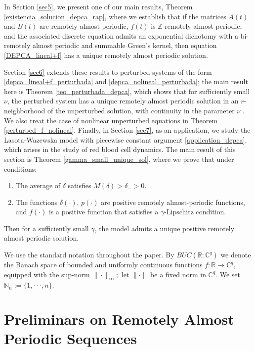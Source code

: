 \documentclass[english,,reqno]{amsart}
\numberwithin{equation}{section}
\theoremstyle{plain}
\theoremstyle{definition}
\theoremstyle{remark}
\begin{document}
In Section \ref{sec5}, we present one of our main results, Theorem \ref{existencia_solucion_depca_rap}, where we establish that if the matrices $A(t)$ and $B(t)$ are remotely almost periodic, $f(t)$ is $\mathbb{Z}$-remotely almost periodic, and the associated discrete equation admits an exponential dichotomy with a bi-remotely almost periodic and summable Green's kernel, then equation \eqref{DEPCA_lineal+f} has a unique remotely almost periodic solution. 

Section \ref{sec6} extends these results to perturbed systems of the form \eqref{depca_lineal+f_perturbada} and \eqref{depca_nolineal_perturbada}; the main result here is Theorem \ref{teo_perturbada_depca}, which shows that for sufficiently small $\nu$, the perturbed system has a unique remotely almost periodic solution in an $r$-neighborhood of the unperturbed solution, with continuity in the parameter $\nu$
. We also treat the case of nonlinear unperturbed equations in Theorem \ref{perturbed_f_nolineal}. Finally, in Section \ref{sec7}, as an application, we study the Lasota-Wazewska model with piecewise constant argument \eqref{application_depca}, which arises in the study of red blood cell dynamics. The main result of this section is Theorem \ref{gamma_small_unique_sol}, where we prove that under conditions:

\begin{enumerate}[label=\textbf{(LW.\arabic*)}]
\item\label{ILW1} The average of $\delta$ satisfies $M(\delta) > \delta_{-} > 0$.
\item\label{ILW2} The functions $\delta(\cdot)$, $p(\cdot)$ are positive remotely almost-periodic functions,  
and $f(\cdot)$ is a positive function that satisfies a $\gamma$-Lipschitz condition.
\end{enumerate}
Then for a sufficiently small $\gamma$, the model admits a unique positive remotely almost periodic solution.



We use the standard notation throughout the paper. By $BUC({\mathbb R } : {\mathbb C }^{q})$ we denote the Banach space of bounded and uniformly continuous functions $f : {\mathbb R } \rightarrow {\mathbb C }^{q},$ 
equipped with the sup-norm $\| \cdot \|_{\infty};$ let $\| \cdot \|$ be a fixed norm in ${\mathbb C}^{q}.$ We set ${\mathbb N}_{n}:=\{1,\cdot \cdot \cdot, n\}.$




\section{Preliminars on Remotely Almost Periodic Sequences}\label{sec2}
\end{document}
